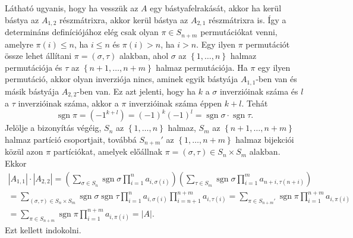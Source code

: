 \documentclass[a4paper, showtrims]{memoir}
\makeatletter
\renewenvironment{proof}[1][\proofname]
    {\par\pushQED{\qed}%
    \normalfont \topsep6\p@\@plus6\p@\relax
    \trivlist
    \item[\hskip\labelsep
        \itshape
    #1\@addpunct{:}]\ignorespaces}
    {\popQED\endtrivlist\@endpefalse}
\theoremstyle{plain}
\theoremstyle{remark}
\theoremstyle{definition}
\DeclareMathOperator{\sgn}{sgn}
\makeatother
\begin{document}
\begin{proof}[Definíció alapján]
	Látható ugyanis, hogy ha vesszük az $A$ egy bástyafelrakását, akkor ha kerül bástya az $A_{1,2}$ részmátrixra,
	akkor kerül bástya az $A_{2,1}$ részmátrixra is.
	Így a determináns definíciójához elég csak olyan $\pi\in S_{n+m}$ permutációkat venni,
	amelyre $\pi(i)\leq n$, ha $i\leq n$ és $\pi(i)>n$, ha $i>n$.
	Egy ilyen $\pi$ permutációt össze lehet állítani $\pi=\left( \sigma,\tau \right)$ alakban,
	ahol $\sigma$ az $\left\{ 1,\ldots,n \right\}$ halmaz permutációja és $\tau$ az $\left\{ n+1,\ldots,n+m \right\}$ halmaz permutációja.
	Ha $\pi$ egy ilyen permutáció,
	akkor olyan inverziója nincs,
	aminek egyik bástyája $A_{1,1}$-ben van és másik bástyája $A_{2,2}$-ben van.
	Ez azt jelenti,
	hogy ha $k$ a $\sigma$ inverzióinak száma és $l$ a $\tau$ inverzióinak száma, akkor
	a $\pi$ inverzióinak száma éppen $k+l$.
	Tehát
	\[
		\sgn\pi=\left( -1^{k+l} \right)=\left( -1 \right)^k\left( -1 \right)^l=\sgn\sigma\cdot\sgn\tau.
	\]
	Jelölje a bizonyítás végéig,
	$S_n$ az $\left\{ 1,\ldots,n \right\}$ halmaz, $S_m$ az $\left\{ n+1,\ldots,n+m \right\}$ halmaz partíció csoportjait, továbbá
	$S_{n+m}'$ az $\left\{ 1,\ldots,n+m \right\}$ halmaz bijekciói közül azon $\pi$ partíciókat,
	amelyek előállnak $\pi=\left( \sigma,\tau \right)\in S_n\times S_m$ alakban.
	Ekkor
	\begin{multline*}
		|A_{1,1}|\cdot |A_{2,2}|=
		\left(
		\sum_{\sigma\in S_n}\sgn\sigma\prod_{i=1}^na_{i,\sigma(i)}
		\right)
		\left(
		\sum_{\tau\in S_m}\sgn\sigma\prod_{i=1}^ma_{n+i,\tau(n+i)}
		\right)
		\\
		=
		\sum_{(\sigma,\tau)\in S_n\times S_m}\sgn\sigma\sgn\tau\prod_{i=1}^na_{i,\sigma(i)}\prod_{i=n+1}^{n+m}a_{i,\tau(i)}
		=
		\sum_{\pi\in S_{n+m}'}\sgn\pi\prod_{i=1}^{n+m}a_{i,\pi(i)}
		\\
		=
		\sum_{\pi\in S_{n+m}}\sgn\pi\prod_{i=1}^{n+m}a_{i,\pi(i)}
		=
		|A|.
	\end{multline*}
	Ezt kellett indokolni.
\end{proof}
\end{document}
